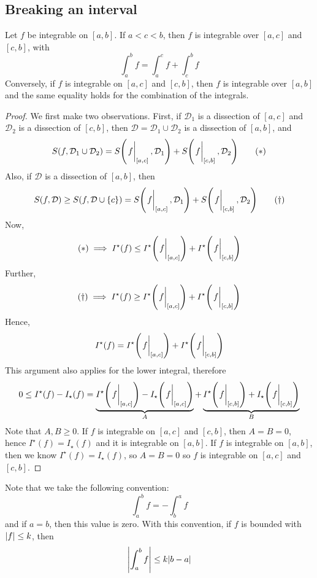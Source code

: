 \subsection{Breaking an interval}
Let \(f\) be integrable on \([a, b]\).
If \(a < c < b\), then \(f\) is integrable over \([a, c]\) and \([c, b]\), with
\[
	\int_a^b f = \int_a^c f + \int_c^b f
\]
Conversely, if \(f\) is integrable on \([a, c]\) and \([c, b]\), then \(f\) is integrable over \([a, b]\) and the same equality holds for the combination of the integrals.
\begin{proof}
	We first make two observations.
	First, if \(\mathcal D_1\) is a dissection of \([a, c]\) and \(\mathcal D_2\) is a dissection of \([c, b]\), then \(\mathcal D = \mathcal D_1 \cup \mathcal D_2\) is a dissection of \([a, b]\), and
	\begin{equation}
		S(f, \mathcal D_1 \cup \mathcal D_2) = S\qty(\eval{f}_{[a, c]}, \mathcal D_1) + S\qty(\eval{f}_{[c, b]}, \mathcal D_2)
		\tag{\(\ast\)}
	\end{equation}
	Also, if \(\mathcal D\) is a dissection of \([a, b]\), then
	\begin{equation}
		S(f, \mathcal D) \geq S(f, \mathcal D \cup \{ c \}) = S\qty(\eval{f}_{[a, c]}, \mathcal D_1) + S\qty(\eval{f}_{[c, b]}, \mathcal D_2)
		\tag{\(\dagger\)}
	\end{equation}
	Now,
	\[
		(\ast) \implies I^\star(f) \leq I^\star\qty(\eval{f}_{[a, c]}) + I^\star\qty(\eval{f}_{[c, b]})
	\]
	Further,
	\[
		(\dagger) \implies I^\star(f) \geq I^\star\qty(\eval{f}_{[a, c]}) + I^\star\qty(\eval{f}_{[c, b]})
	\]
	Hence,
	\[
		I^\star(f) = I^\star\qty(\eval{f}_{[a, c]}) + I^\star\qty(\eval{f}_{[c, b]})
	\]
	This argument also applies for the lower integral, therefore
	\[
		0 \leq I^\star(f) - I_\star(f) = \underbrace{I^\star\qty(\eval{f}_{[a, c]}) - I_\star\qty(\eval{f}_{[a, c]})}_{A} + \underbrace{I^\star\qty(\eval{f}_{[c, b]}) + I_\star\qty(\eval{f}_{[c, b]})}_{B}
	\]
	Note that \(A, B \geq 0\).
	If \(f\) is integrable on \([a, c]\) and \([c, b]\), then \(A = B = 0\), hence \(I^\star(f) = I_\star(f)\) and it is integrable on \([a, b]\).
	If \(f\) is integrable on \([a, b]\), then we know \(I^\star(f) = I_\star(f)\), so \(A = B = 0\) so \(f\) is integrable on \([a, c]\) and \([c, b]\).
\end{proof}
Note that we take the following convention:
\[
	\int_a^b f = -\int_b^a f
\]
and if \(a=b\), then this value is zero.
With this convention, if \(f\) is bounded with \(\abs{f} \leq k\), then
\[
	\abs{\int_a^b f} \leq k\abs{b - a}
\]

